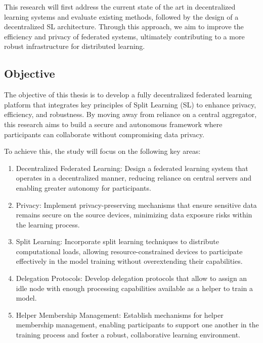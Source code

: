 This research will first address the current state of the art in decentralized learning systems and evaluate existing methods, followed by the design of a decentralized SL architecture.
Through this approach, we aim to improve the efficiency and privacy of federated systems, ultimately contributing to a more robust infrastructure for distributed learning. 





\subsection{Objective}
\label{sub:time_is_money}

The objective of this thesis is to develop a fully decentralized federated learning platform that integrates key principles of Split Learning (SL) to enhance privacy, efficiency, and robustness. By moving away from reliance on a central aggregator, this research aims to build a secure and autonomous framework where participants can collaborate without compromising data privacy.


To achieve this, the study will focus on the following key areas:

\begin{enumerate}

 \item {}Decentralized Federated Learning: Design a federated learning system that operates in a decentralized manner, reducing reliance on central servers and enabling greater autonomy for participants.
 
 \item Privacy: Implement privacy-preserving mechanisms that ensure sensitive data remains secure on the source devices, minimizing data exposure risks within the learning process.

 
 \item Split Learning: Incorporate split learning techniques to distribute computational loads, allowing resource-constrained devices to participate effectively in the model training without overextending their capabilities.

 
 \item Delegation Protocols:  Develop delegation protocols that allow to assign an idle node with enough processing capabilities available as a helper to train a model.

\item Helper Membership Management: Establish mechanisms for helper membership management, enabling participants to support one another in the training process and foster a robust, collaborative learning environment.


\end{enumerate}

